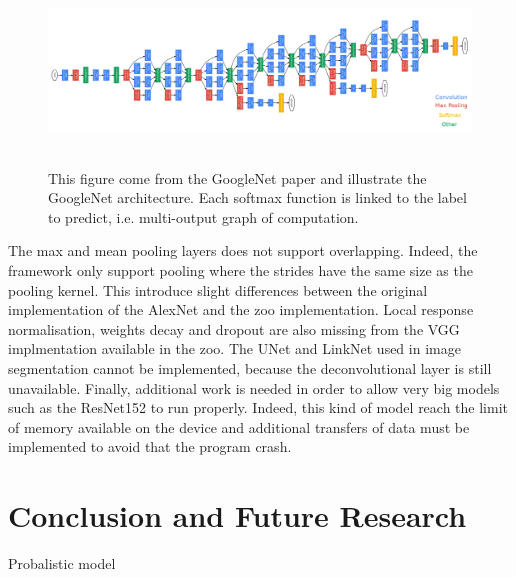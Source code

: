 \documentclass[11pt]{report}
\begin{document}
\begin{figure}[h]
\centering
\includegraphics[width=16cm, height=5cm]{googlenet}
\caption[GoogleNet architecture]{This figure come from the GoogleNet paper \cite{DBLP:conf/cvpr/SzegedyLJSRAEVR15} and illustrate the GoogleNet architecture. Each softmax function is linked to the label to predict, i.e. multi-output graph of computation.}
\label{fig:googlenet}
\end{figure}
\noindent The max and mean pooling layers does not support overlapping. Indeed, the framework only support pooling where the strides have the same size as the pooling kernel. This introduce slight differences between the original implementation of the AlexNet and the zoo implementation.
\newline
\newline
\noindent Local response normalisation, weights decay and dropout are also missing from the VGG implmentation available in the zoo. The UNet and LinkNet used in image segmentation cannot be implemented, because the deconvolutional layer is still unavailable.
\newline
\newline
\noindent Finally, additional work is needed in order to allow very big models such as the ResNet152 to run properly. Indeed, this kind of model reach the limit of memory available on the device and additional transfers of data must be implemented to avoid that the program crash.

\chapter{Conclusion and Future Research} \label{conclusion}


Probalistic model

\printbibliography
\end{document}
